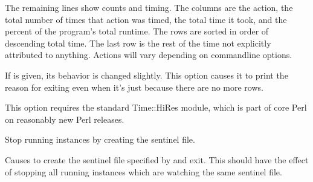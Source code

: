\documentclass[letterpaper,10pt,english]{sphinxmanual}
\begin{document}
\begin{fulllineitems}
\sphinxAtStartPar
The remaining lines show counts and timing.  The columns are the action, the
total number of times that action was timed, the total time it took, and the
percent of the program’s total runtime.  The rows are sorted in order of
descending total time.  The last row is the rest of the time not explicitly
attributed to anything.  Actions will vary depending on command\sphinxhyphen{}line options.

\sphinxAtStartPar
If {\hyperref[\detokenize{mariadb-archiver:cmdoption-mariadb-archiver-why-quit}]{}} is given, its behavior is changed slightly.  This option
causes it to print the reason for exiting even when it’s just because there are
no more rows.

\sphinxAtStartPar
This option requires the standard Time::HiRes module, which is part of core Perl
on reasonably new Perl releases.

\end{fulllineitems}


\begin{fulllineitems}
\label{\detokenize{mariadb-archiver:cmdoption-mariadb-archiver-stop}}
\sphinxAtStartPar
Stop running instances by creating the sentinel file.

\sphinxAtStartPar
Causes  to create the sentinel file specified by {\hyperref[\detokenize{mariadb-archiver:cmdoption-mariadb-archiver-sentinel}]{}} and
exit.  This should have the effect of stopping all running instances which are
watching the same sentinel file.

\end{fulllineitems}

\end{document}
